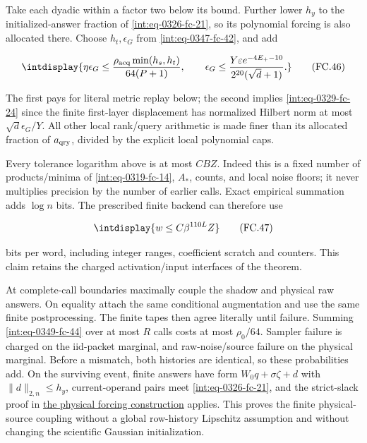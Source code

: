 Take each dyadic within a factor two below its bound. Further lower \(h_y\) to the initialized-answer fraction of \eqref{int:eq-0326-fc-21}, so its polynomial forcing is also allocated there. Choose \(h_t,\allowbreak \epsilon_G\) from \eqref{int:eq-0347-fc-42}, and add


\begingroup\renewcommand{\theHequation}{intdisplay.751}
\begin{equation}
\intdisplay{
\eta\epsilon_G\le
\frac{\rho_{\rm acq}\min(h_s,h_t)}{64(P+1)},\qquad
\epsilon_G\le\frac{Y\varepsilon e^{-4E_+-10}}
{2^{20}(\sqrt d+1)}.
}
\tag{FC.46}
\label{int:eq-0351-fc-46}
\end{equation}
\endgroup


The first pays for literal metric replay below; the second implies \eqref{int:eq-0329-fc-24} since the finite first-layer displacement has normalized Hilbert norm at most \(\sqrt d\epsilon_G/Y\). All other local rank/query arithmetic is made finer than its allocated fraction of \(a_{\rm qry}\), divided by the explicit local polynomial caps.



Every tolerance logarithm above is at most \(CBZ\). Indeed this is a fixed number of products/minima of \eqref{int:eq-0319-fc-14}, \(A_\ast\), counts, and local noise floors; it never multiplies precision by the number of earlier calls. Exact empirical summation adds \(\log n\) bits. The prescribed finite backend can therefore use


\begingroup\renewcommand{\theHequation}{intdisplay.752}
\begin{equation}
\intdisplay{
w\le C\beta^{110L}Z
}
\tag{FC.47}
\label{int:eq-0352-fc-47}
\end{equation}
\endgroup


bits per word, including integer ranges, coefficient scratch and counters. This claim retains the charged activation/input interfaces of the theorem.



At complete-call boundaries maximally couple the shadow and physical raw answers. On equality attach the same conditional augmentation and use the same finite postprocessing. The finite tapes then agree literally until failure. Summing \eqref{int:eq-0349-fc-44} over at most \(R\) calls costs at most \(\rho_0/64\). Sampler failure is charged on the iid-packet marginal, and raw-noise/source failure on the physical marginal. Before a mismatch, both histories are identical, so these probabilities add. On the surviving event, finite answers have form \(W_0q+\sigma\zeta+d\) with \(\|d\|_{2,\allowbreak n}\le h_y\), current-operand pairs meet \eqref{int:eq-0326-fc-21}, and the strict-slack proof in \hyperref[int:decoder-physical-forcing]{the physical forcing construction} applies. This proves the finite physical-source coupling without a global row-history Lipschitz assumption and without changing the scientific Gaussian initialization.


